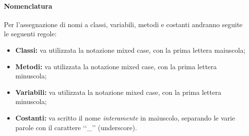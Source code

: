 \paragraph{Nomenclatura\\}
\label{nomenclatura}
Per l'assegnazione di nomi a classi, variabili, metodi e costanti andranno seguite le seguenti regole:
\begin{itemize}
\item\textbf{Classi:} va utilizzata la notazione mixed case, con la prima lettera maiuscola;
\item\textbf{Metodi:} va utilizzata la notazione mixed case, con la prima lettera minuscola;
\item\textbf{Variabili:} va utilizzata la notazione mixed case, con la prima lettera minuscola;
\item\textbf{Costanti:} va scritto il nome \textit{interamente} in maiuscolo, separando le varie parole con il carattere \lq\lq{}\_\rq\rq{} (underscore).
\end{itemize}

